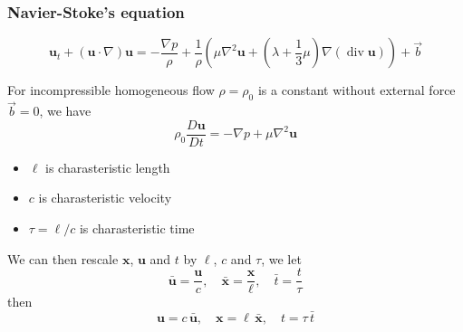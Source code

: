 \subsubsection{Navier-Stoke's equation} %


\begin{equation}
\textbf{u}_{t} + \left(\textbf{u}\cdot\nabla\right)\textbf{u}
=
-\frac{\nabla p}{\rho}
+
\frac{1}{\rho} \left(\mu\nabla^2\textbf{u} + \left(\lambda+\frac{1}{3}\mu\right)\nabla\left(\operatorname{div}\textbf{u}\right)\right) + \vec{b}
\end{equation}

For incompressible homogeneous flow $\rho = \rho_0$ is a constant without external force $\vec{b} = 0$, we have
\begin{equation}
\rho_0\frac{D\textbf{u}}{Dt} = - \nabla p + \mu\nabla^2\textbf{u}
\end{equation}


\begin{itemize}
	\item $\ell$ is charasteristic length
	\item $c$ is charasteristic velocity
	\item $\tau = \ell/c$ is charasteristic time

\end{itemize}
We can then rescale $\textbf{x}$, $\textbf{u}$ and $t$ by $\ell$, $c$ and $\tau$, we let
\begin{equation}
\bar{\textbf{u}} = \frac{\textbf{u}}{c},\quad
\bar{\textbf{x}} = \frac{\textbf{x}}{\ell},\quad
\bar{t} = \frac{t}{\tau}
\end{equation}
then
\begin{equation}
\textbf{u} = c\,\bar{\textbf{u}},\quad
\textbf{x} = \ell\,\bar{\textbf{x}},\quad
t = \tau\,\bar{t}
\end{equation}



